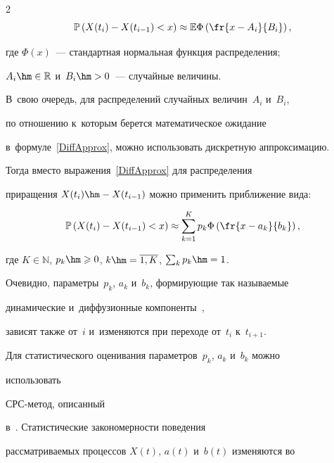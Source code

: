 \begin{multicols}{2}
\begin{equation}

\label{DiffApprox}

\mathbb{P}\left(X(t_i)-X(t_{i-1})<x\right)\approx \mathbb{E}\Phi\left(\fr{x-A_i}{B_i}\right),

\end{equation}

где $\Phi(x)$~--- стандартная нормальная функция распределения;

$A_i\hm\in\mathbb{R}$ и~$B_i\hm>0$~--- случайные величины. 

В~свою очередь, для распределений случайных величин~$A_i$ и~$B_i$, 

по отношению к~которым берется математическое ожидание 

в~формуле~\eqref{DiffApprox}, можно использовать дискретную аппроксимацию. 

Тогда вместо выражения~\eqref{DiffApprox} для распределения

 приращения $X(t_i)\hm-X(t_{i-1})$ можно применить приближение вида:



\noindent

\begin{equation}

\label{DiffDiscrApprox}

\mathbb{P}\left(X(t_i)-X(t_{i-1})<x\right)\approx\sum\limits_{k=1}^K

p_k\Phi\left(\fr{x-a_k}{b_k}\right),

\end{equation}

где $K\in\mathbb{N}$, $p_k\hm\geqslant0$, $k\hm=\overline{1,K}$, $\sum\nolimits_{k} p_k\hm=1$. 

Очевидно, параметры~$p_k$, $a_k$ и~$b_k$, формирующие так на\-зы\-ва\-емые 

динамические и~диффузионные компоненты~\cite{Korolev2011}, 

зависят также от~$i$ и~изменяются при переходе от~$t_i$ к~$t_{i+1}$.



Для статистического оценивания параметров~$p_k$, $a_k$ и~$b_k$ можно 

использовать %

СРС-ме\-тод, описанный 

в~\cite{Korolev2011}. Статистические закономерности поведения 

рассматриваемых процессов $X(t)$, $a(t)$ и~$b(t)$ изменяются во 


\end{multicols}

